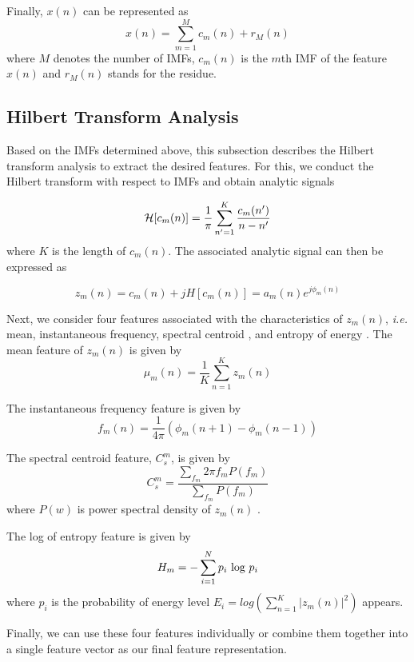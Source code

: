 Finally, $x(n)$ can be represented as
\begin{equation}
      x(n) = \sum_{m=1}^{M} c_{m}(n) + r_{M}(n)
\end{equation}
where $M$ denotes the number of IMFs, $c_{m}(n)$ is the $m$th IMF of
the feature  $x(n)$ and $r_{M}(n)$ stands for the residue.

\subsection{Hilbert Transform Analysis}
Based on the IMFs determined above, this subsection
describes the Hilbert transform analysis  to extract the desired
features. For this, we conduct the Hilbert transform with
respect to IMFs and obtain
analytic signals %




\begin{equation}
{\cal H}[c_{m}(n)] = \frac{1}{\pi}\sum_{n' = 1 }^{K
}\frac{c_{m}(n')}{n-n'}
\end{equation}
where $K$ is the length of $c_{m}(n)$. The associated analytic
signal can then be expressed as


\begin{equation}
    z_{m}(n) = c_{m}(n) + jH[c_{m}(n)] = a_{m}(n)e^{j\phi_{m}(n)}
\end{equation}

Next, we consider four features associated with the
characteristics of $z_{m}(n)$, {\it i.e.} mean,
instantaneous frequency, spectral centroid \cite{riaz2016emd}, and
entropy of energy \cite{tolwinski2007hilbert}. The  mean feature of
$z_{m}(n)$  is given by
\begin{equation}
    \mu_{m}(n) = \frac{1}{K}\sum_{n=1}^{K} z_{m}(n)
\end{equation}


The instantaneous frequency feature %
is given by
\begin{equation}
f_{m}(n) = \frac{1}{4\pi}(\phi_{m}(n+1)-\phi_{m}(n-1))
\end{equation}

The spectral centroid feature,  $C_{s}^{m} $, is given by
\begin{equation}
    C_{s}^{m} = \frac{\sum_{f_{m}}2 \pi f_{m}P(f_{m})}{\sum_{f_{m}}P(f_{m})}
\end{equation}
where $P(w)$ is power spectral density of  $z_{m}(n)$
\cite{riaz2016emd}.

The log of entropy feature is given by
\begin{equation}
    H_{m} = - \sum_{i=1}^{N}p_{i} \ \textup{log} \ p_{i}
\end{equation}
where $p_{i}$ is the probability of energy level $E_{i}
=log(\sum_{n=1}^{K}|z_{m}(n)|^{2})$ appears.


Finally, we can use these four features individually or
combine them together into a single feature vector as our final
feature representation.

